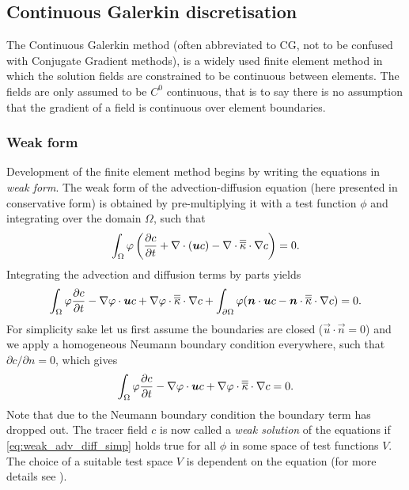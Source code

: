 \subsection{Continuous Galerkin discretisation}
\label{sec:ND_advection_diffusion_CG}

The Continuous Galerkin method (often abbreviated to CG,
not to be confused with Conjugate Gradient methods),
is a widely used finite element method in which
the solution fields are constrained to be
continuous between elements.
The fields are only assumed to be $C^0$
continuous, that is to say there is no assumption that the gradient of a
field is continuous over element boundaries.

\subsubsection{Weak form}

Development of the finite element method begins by writing the equations in
\emph{weak form}.  The weak form of the advection-diffusion equation
(here presented in conservative form) is
obtained by pre-multiplying it with a test function $\phi$
and integrating over the domain $\Omega$, such that
\begin{equation}
  \int_\Omega \varphi \left( \frac{\partial c}{\partial t} + \nabla\cdot({\mbox{\boldmath$u$}} c) -
    \nabla\cdot\overline{\overline{\kappa}}\cdot \nabla c\right) = 0.
\end{equation}
Integrating the advection and diffusion terms by parts yields
\begin{equation}\label{eq:weak_adv_diff}
  \int_\Omega
  \varphi \frac{\partial c}{\partial t}
  -\nabla\varphi\cdot{\mbox{\boldmath$u$}} c +
  \nabla\varphi\cdot \overline{\overline{\kappa}}\cdot\nabla c
  +\int_{\partial\Omega} \varphi({\mbox{\boldmath$n$}}\cdot {\mbox{\boldmath$u$}} c
  - {\mbox{\boldmath$n$}}\cdot\overline{\overline{\kappa}}\cdot\nabla c)
  = 0.
\end{equation}
For simplicity sake let us first assume the boundaries are closed
($\vec{u}\cdot\vec{n}=0$) and we apply a homogeneous Neumann boundary
condition everywhere, such that $\partial c/\partial n=0$, which gives
\begin{equation}\label{eq:weak_adv_diff_simp}
  \int_\Omega \varphi \frac{\partial c}{\partial t}
    -\nabla\varphi\cdot{\mbox{\boldmath$u$}} c +
    \nabla\varphi\cdot \overline{\overline{\kappa}}\cdot\nabla c = 0.
\end{equation}
Note that due to the Neumann boundary condition the boundary term has
dropped out. The tracer field $c$ is now called a \emph{weak solution} of
the equations if \eqref{eq:weak_adv_diff_simp} holds true for all $\phi$ in some
space of test functions $V$. The choice of a suitable test space $V$ is dependent
on the equation (for more details see \citet{elman2005}).

